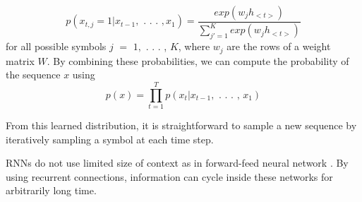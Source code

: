 \documentclass[12pt]{report}
\begin{document}
\begin{equation}
p(x_{t,j} = 1 | x_{t-1},\text{ . . . }, x_{1}) = \frac{exp \left(
w_{j}h_{<t>} \right)}{\sum_{j'=1}^{K} exp \left( w_{j}h_{<t>} \right)}
\end{equation}
for all possible symbols $j$ $=$ $1,$ . . . , $K$, where $w_{j}$
are the rows of a weight matrix $W$. By combining
these probabilities, we can compute the probability
of the sequence $x$ using
\begin{equation}
p(x) = \prod_{t=1}^{T} p \left( x_{t}| x_{t-1},\text{ . . . , }x_{1} \right)
\end{equation}

From this learned distribution, it is straightforward
to sample a new sequence by iteratively sampling
a symbol at each time step.

RNNs do not use limited size of context as in forward-feed neural network \cite{ff_paper}. By using recurrent connections, information can cycle inside these networks for arbitrarily long time.
\end{document}

